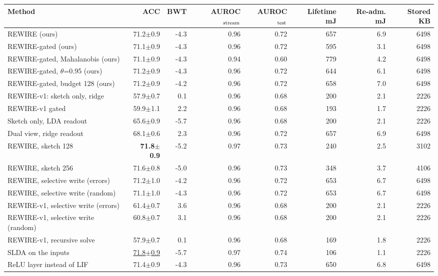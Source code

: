 \begin{tabular}{lrrrrrrr}
\toprule
Method & ACC & BWT & AUROC$_{\rm stream}$ & AUROC$_{\rm test}$ & Lifetime mJ & Re-adm. mJ & Stored KB \\
\midrule
REWIRE (ours) & 71.2{\tiny$\pm$0.9} & -4.3 & 0.96 & 0.72 & 657 & 6.9 & 6498 \\
REWIRE-gated (ours) & 71.1{\tiny$\pm$0.9} & -4.3 & 0.96 & 0.72 & 595 & 3.1 & 6498 \\
REWIRE-gated, Mahalanobis (ours) & 71.1{\tiny$\pm$0.9} & -4.3 & 0.94 & 0.60 & 779 & 4.2 & 6498 \\
REWIRE-gated, $\theta$=0.95 (ours) & 71.2{\tiny$\pm$0.9} & -4.3 & 0.96 & 0.72 & 644 & 6.1 & 6498 \\
REWIRE-gated, budget 128 (ours) & 71.2{\tiny$\pm$0.9} & -4.2 & 0.96 & 0.72 & 658 & 7.0 & 6498 \\
REWIRE-v1: sketch only, ridge & 57.9{\tiny$\pm$0.7} & 0.1 & 0.96 & 0.68 & 200 & 2.1 & 2226 \\
REWIRE-v1 gated & 59.9{\tiny$\pm$1.1} & 2.2 & 0.96 & 0.68 & 193 & 1.7 & 2226 \\
Sketch only, LDA readout & 65.6{\tiny$\pm$0.9} & -5.7 & 0.96 & 0.68 & 200 & 2.1 & 2226 \\
Dual view, ridge readout & 68.1{\tiny$\pm$0.6} & 2.3 & 0.96 & 0.72 & 657 & 6.9 & 6498 \\
REWIRE, sketch 128 & \textbf{71.8{\tiny$\pm$0.9}} & -5.2 & 0.97 & 0.73 & 240 & 2.5 & 3102 \\
REWIRE, sketch 256 & 71.6{\tiny$\pm$0.8} & -5.0 & 0.96 & 0.73 & 348 & 3.7 & 4106 \\
REWIRE, selective write (errors) & 71.2{\tiny$\pm$1.0} & -4.2 & 0.96 & 0.72 & 653 & 6.7 & 6498 \\
REWIRE, selective write (random) & 71.1{\tiny$\pm$1.0} & -4.3 & 0.96 & 0.72 & 653 & 6.7 & 6498 \\
REWIRE-v1, selective write (errors) & 61.4{\tiny$\pm$0.7} & 3.6 & 0.96 & 0.68 & 200 & 2.1 & 2226 \\
REWIRE-v1, selective write (random) & 60.8{\tiny$\pm$0.7} & 3.1 & 0.96 & 0.68 & 200 & 2.1 & 2226 \\
REWIRE-v1, recursive solve & 57.9{\tiny$\pm$0.7} & 0.1 & 0.96 & 0.68 & 169 & 1.8 & 2226 \\
SLDA on the inputs & \underline{71.8{\tiny$\pm$0.9}} & -5.7 & 0.97 & 0.74 & 106 & 1.1 & 2226 \\
ReLU layer instead of LIF & 71.4{\tiny$\pm$0.9} & -4.3 & 0.96 & 0.73 & 650 & 6.8 & 6498 \\

\end{tabular}
